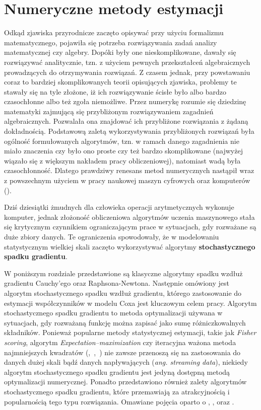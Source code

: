\chapter{Numeryczne metody estymacji}\label{numPAJ}

Odkąd zjawiska przyrodnicze zaczęto opisywać przy użyciu formalizmu matematycznego,
pojawiła się potrzeba rozwiązywania zadań analizy matematycznej czy algebry. Dopóki były
one nieskomplikowane, dawały się rozwiązywać analitycznie, tzn. z użyciem pewnych
przekształceń algebraicznych prowadzących do otrzymywania rozwiązań. Z czasem jednak, przy powstawaniu coraz to bardziej skomplikowanych teorii
opisujących zjawiska, problemy te stawały się na tyle złożone, iż ich rozwiązywanie ścisłe
było albo bardzo czasochłonne albo też zgoła niemożliwe. Przez numerykę rozumie się dziedzinę matematyki
zajmującą się przybliżonym rozwiązywaniem zagadnień algebraicznych. Pozwalała ona znajdować ich 
przybliżone rozwiązania z żądaną dokładnością. Podstawową zaletą wykorzystywania przybliżonych rozwiązań była ogólność
formułowanych algorytmów, tzn. w ramach danego zagadnienia nie miało znaczenia czy było
ono proste czy też bardzo skomplikowane (najwyżej wiązało się z większym nakładem pracy
obliczeniowej), natomiast wadą była czasochłonność. Dlatego prawdziwy renesans metod
numerycznych nastąpił wraz z powszechnym użyciem w pracy naukowej maszyn cyfrowych oraz komputerów (\cite{milewski}). 

Dziś dziesiątki żmudnych dla człowieka operacji
arytmetycznych wykonuje komputer, jednak złożoność obliczeniowa algorytmów uczenia maszynowego stała się krytycznym czynnikiem ograniczającym prace w sytuacjach, gdy rozważane są duże zbiory danych. Te ograniczenia spowodowały, że w modelowaniu statystycznym wielkiej skali zaczęto wykorzystywać algorytmy \textbf{stochastycznego spadku gradientu}. 

W poniższym rozdziale przedstawione są klasyczne algorytmy spadku wzdłuż gradientu Cauchy'ego oraz Raphsona-Newtona. Następnie omówiony jest algorytm stochastycznego spadku wzdłuż gradientu, którego zastosowanie do estymacji współczynników w modelu Coxa jest kluczowym celem pracy. Algorytm stochastycznego spadku gradientu to metoda optymalizacji używana w sytuacjach, gdy rozważaną funkcję można zapisać jako sumę różniczkowalnych składników. Ponieważ popularne metody statystycznej estymacji, takie jak \textit{Fisher scoring}, algorytm \textit{Expectation–maximization} czy iteracyjna ważona metoda najmniejszych kwadratów (\cite{fisher3},~\cite{dempster},~\cite{greenPJ}) nie zawsze przenoszą się na zastosowania do danych dużej skali bądź danych napływających (\textit{ang. streaming data}), niekiedy algorytm stochastycznego spadku gradientu jest jedyną dostępną metodą optymalizacji numerycznej. Ponadto przedstawiono również zalety algorytmów stochastycznego spadku gradientu, które przemawiają za atrakcyjnością i popularnością tego typu rozwiązania. Omawiane pojęcia oparto o \cite{bott1}, \cite{bott2}, \cite{kotlowski} oraz \cite{fortuna}.

